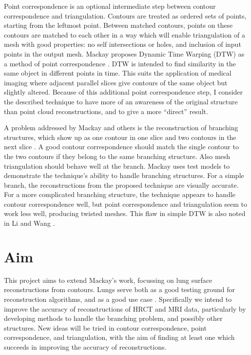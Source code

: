 \documentclass[12pt]{article}
\begin{document}
Point correspondence is an optional intermediate step between contour correspondence and triangulation. Contours are treated as ordered sets of points, starting from the leftmost point. Between matched contours, points on these contours are matched to each other in a way which will enable triangulation of a mesh with good properties: no self intersections or holes, and inclusion of input points in the output mesh. Mackay proposes Dynamic Time Warping (DTW) as a method of point correspondence \cite{mackay2019robust}. DTW is intended to find similarity in the same object in different points in time. This suits the application of medical imaging where adjacent parallel slices give contours of the same object but slightly altered. Because of this additional point correspondence step, I consider the described technique to have more of an awareness of the original structure than point cloud reconstructions, and to give a more “direct” result.

A problem addressed by Mackay and others is the reconstruction of branching structures, which show up as one contour in one slice and two contours in the next slice \cite{mackay2019robust, akkouche2004implicit}. A good contour correspondence should match the single contour to the two contours if they belong to the same branching structure. Also mesh triangulation should behave well at the branch. Mackay uses test models to demonstrate the technique’s ability to handle branching structures. For a simple branch, the reconstructions from the proposed technique are visually accurate. For a more complicated branching structure, the technique appears to handle contour correspondence well, but point correspondence and triangulation seem to work less well, producing twisted meshes. This flaw in simple DTW is also noted in Li and Wang \cite{li2021method}.

\section{Aim}

This project aims to extend Mackay’s work, focussing on lung surface reconstructions from contours. Lungs serve both as a good testing ground for reconstruction algorithms, and as a good use case \cite{pluta2012new}. Specifically we intend to improve the accuracy of reconstructions of HRCT and MRI data, particularly by developing methods to handle the branching problem, and possibly other structures. New ideas will be tried in contour correspondence, point correspondence, and triangulation, with the aim of finding at least one which succeeds in improving the accuracy of reconstructions. 
\end{document}

